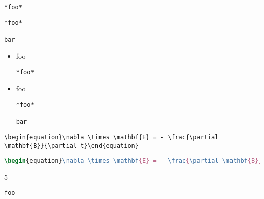 
\def\mytitle{Fenced Code Blocks}


\begin{verbatim}
*foo*
\end{verbatim}

\begin{verbatim}
*foo*

bar
\end{verbatim}

\begin{itemize}
\item{} foo

\begin{verbatim}
*foo*
\end{verbatim}

\item{} foo

\begin{verbatim}
*foo*

bar
\end{verbatim}

\end{itemize}

\begin{verbatim}
\begin{equation}\nabla \times \mathbf{E} = - \frac{\partial \mathbf{B}}{\partial t}\end{equation}
\end{verbatim}

\begin{lstlisting}[language=tex]
\begin{equation}\nabla \times \mathbf{E} = - \frac{\partial \mathbf{B}}{\partial t}\end{equation}
\end{lstlisting}

5

\begin{verbatim}
foo
\end{verbatim}



